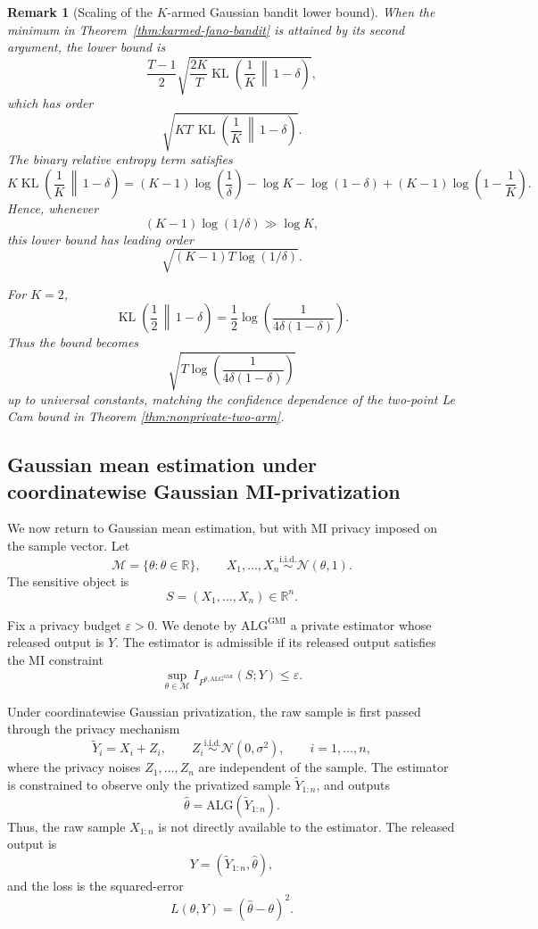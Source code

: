 \documentclass[journal]{IEEEtran}
\newtheorem{remark}{Remark}
\newcommand{\ALG}{\mathrm{ALG}}
\newcommand{\KL}{\operatorname{KL}}
\begin{document}
\begin{remark}[Scaling of the \(K\)-armed Gaussian bandit lower bound]
\label{rem:fano-kl-confidence-term}
When the minimum in Theorem~\ref{thm:karmed-fano-bandit} is attained by its
second argument, the lower bound is
\[
\frac{T-1}{2}
\sqrt{
\frac{2K}{T}
\KL\left(\frac1K\,\middle\|\,1-\delta\right)
},
\]
which has order
\[
\sqrt{
KT\,
\KL\left(\frac1K\,\middle\|\,1-\delta\right)
}.
\]
The binary relative entropy term satisfies
\[
K\KL\left(\frac1K\,\middle\|\,1-\delta\right)
=
(K-1)\log\left(\frac1\delta\right)
-\log K
-\log(1-\delta)
+
(K-1)\log\left(1-\frac1K\right).
\]
Hence, whenever
\[
(K-1)\log(1/\delta)\gg \log K,
\]
this lower bound has leading order
\[
\sqrt{(K-1)T\log(1/\delta)}.
\]

For \(K=2\),
\[
\KL\left(\frac12\,\middle\|\,1-\delta\right)
=
\frac12
\log\left(\frac{1}{4\delta(1-\delta)}\right).
\]
Thus the bound becomes
\[
\sqrt{
T\log\left(\frac{1}{4\delta(1-\delta)}\right)
}
\]
up to universal constants, matching the confidence dependence of the
two-point Le Cam bound in Theorem \ref{thm:nonprivate-two-arm}.
\end{remark}

\subsection{Gaussian mean estimation under coordinatewise Gaussian MI-privatization}
\label{sec:private-mean}

We now return to Gaussian mean estimation, but with MI privacy imposed on the
sample vector. Let
\[
\mathcal M=\{\theta:\theta\in\mathbb R\},
\qquad
X_1,\dots,X_n \stackrel{\mathrm{i.i.d.}}{\sim} \mathcal N(\theta,1).
\]
The sensitive object is
\[
S=(X_1,\dots,X_n)\in\mathbb R^n.
\]

Fix a privacy budget \(\varepsilon>0\). We denote by
\(\ALG^{\mathrm{GMI}}\) a private estimator whose released output
is \(Y\). The estimator is admissible if its released output satisfies the MI constraint
\[
\sup_{\theta\in\mathcal M}
I_{P^{\theta,\ALG^{\mathrm{GMI}}}}(S;Y)
\le \varepsilon.
\]

Under coordinatewise Gaussian privatization, the raw sample is first passed
through the privacy mechanism
\[
\widetilde Y_i=X_i+Z_i,
\qquad
Z_i \stackrel{\mathrm{i.i.d.}}{\sim}\mathcal N(0,\sigma^2),
\qquad
i=1,\dots,n,
\]
where the privacy noises \(Z_1,\dots,Z_n\) are independent of the sample. The
estimator is constrained to observe only the privatized sample
\(\widetilde Y_{1:n}\), and outputs
\[
\hat\theta=\ALG(\widetilde Y_{1:n}).
\]
Thus, the raw sample \(X_{1:n}\) is not directly available to the estimator.
The released output is
\[
Y=(\widetilde Y_{1:n},\hat\theta),
\]
and the loss is the squared-error
\[
L(\theta,Y)=(\hat\theta-\theta)^2.
\]
\end{document}
